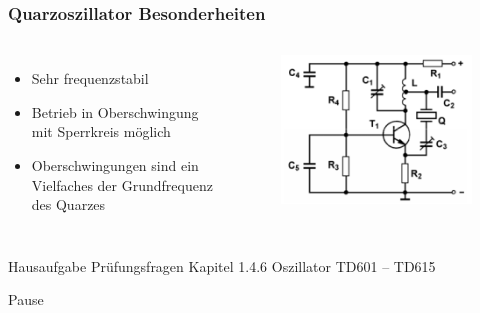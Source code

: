 \begin{frame}
  \frametitle{Quarzoszillator Besonderheiten}
  \begin{columns}
    \begin{itemize}
      \item Sehr frequenzstabil
      \item Betrieb in Oberschwingung mit Sperrkreis möglich
      \item Oberschwingungen sind ein Vielfaches der Grundfrequenz des Quarzes
    \end{itemize}
    \begin{figure}
      \includegraphics[width=\textwidth,height=.7\textheight,keepaspectratio]{a07/TD606_quarz_Oberschwingung.png}
    \end{figure}
  \end{columns}
\end{frame}

\begin{frame}
  \begin{exampleblock}{Hausaufgabe}
    Prüfungsfragen Kapitel 1.4.6 Oszillator TD601 -- TD615
  \end{exampleblock}
\end{frame}

\begin{frame}
  \begin{center}
    \Huge Pause
  \end{center}
\end{frame}

